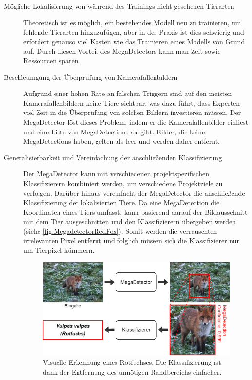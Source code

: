 \begin{description}
	\item[Mögliche Lokalisierung von während des Trainings nicht gesehenen Tierarten]
	
	Theoretisch ist es möglich, ein bestehendes Modell neu zu trainieren, um fehlende Tierarten hinzuzufügen, aber in der Praxis ist dies schwierig und erfordert genauso viel Kosten wie das Trainieren eines Modells von Grund auf. Durch diesen Vorteil des MegaDetectors kann man Zeit sowie Ressourcen sparen.
	
	\item[Beschleunigung der Überprüfung von Kamerafallenbildern]
	
	
	Aufgrund einer hohen Rate an falschen Triggern sind auf den meisten Kamerafallenbildern keine Tiere sichtbar, was dazu führt, dass Experten viel Zeit in die Überprüfung von solchen Bildern investieren müssen.	Der MegaDetector löst dieses Problem, indem er die Kamerafallenbilder einliest und eine Liste von MegaDetections ausgibt. Bilder, die keine MegaDetections haben, gelten als leer und werden daher entfernt.
	
	\item[Generalisierbarkeit und Vereinfachung der anschließenden Klassifizierung]
	
	Der MegaDetector kann mit verschiedenen projektspezifischen Klassifizierern kombiniert werden, um verschiedene Projektziele zu verfolgen. Darüber hinaus vereinfacht der MegaDetector die anschließende Klassifizierung der lokalisierten Tiere. Da eine MegaDetection die Koordinaten eines Tiers umfasst, kann basierend darauf der Bildausschnitt mit dem Tier ausgeschnitten und den Klassifizierern übergeben werden (siehe \autoref{fig:MegadetectorRedFox}). Somit werden die verrauschten irrelevanten Pixel entfernt und folglich müssen sich die Klassifizierer nur um Tierpixel kümmern.
	
	\begin{figure}[!h]
		\centering
		\includegraphics[width=\linewidth]{images/MegadetectorRedFox}
		\caption{Visuelle Erkennung eines Rotfuchses. Die Klassifizierung ist dank der Entfernung des unnötigen Randbereichs einfacher.}
		\label{fig:MegadetectorRedFox}
	\end{figure}
	
\end{description}


